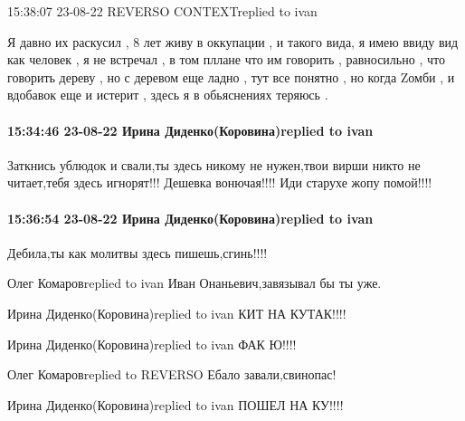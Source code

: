  
 
 
 
 

15:38:07 23-08-22
REVERSO CONTEXTreplied to ivan

Я давно их раскусил , 8 лет живу в оккупации , и такого вида, я имею ввиду вид
как человек , я не встречал , в том пллане что им говорить , равносильно , что
говорить дереву , но с деревом еще ладно , тут все понятно , но когда Zомби , и
вдобавок еще и истерит , здесь я в обьяснениях теряюсь .


\paragraph{15:34:46 23-08-22 Ирина Диденко(Коровина)replied to ivan}

Заткнись ублюдок и свали,ты здесь никому не нужен,твои вирши никто не
читает,тебя здесь игнорят!!! Дешевка вонючая!!!! Иди старухе жопу помой!!!!

\paragraph{15:36:54 23-08-22 Ирина Диденко(Коровина)replied to ivan}

Дебила,ты как молитвы здесь пишешь,сгинь!!!!


Олег Комаровreplied to ivan
Иван Онаньевич,завязывал бы ты уже.

Ирина Диденко(Коровина)replied to ivan
КИТ НА КУТАК!!!!

Ирина Диденко(Коровина)replied to ivan
ФАК Ю!!!!

Олег Комаровreplied to REVERSO
Ебало завали,свинопас!

Ирина Диденко(Коровина)replied to ivan
ПОШЕЛ НА КУ!!!!
